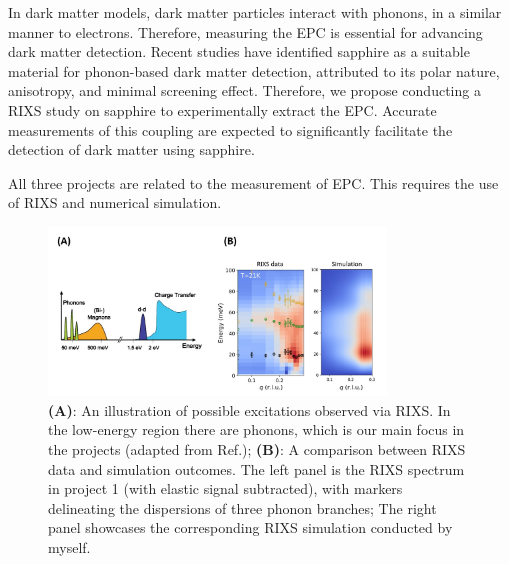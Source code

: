 \documentclass[11pt]{article}
\begin{document}
In dark matter models, dark matter particles interact with phonons, in a similar manner to electrons\cite{griffin_directional_2018}. Therefore, measuring the EPC is essential for advancing dark matter detection. 
Recent studies have identified sapphire as a suitable material for phonon-based dark matter detection, attributed to its polar nature, anisotropy, and minimal screening effect\cite{griffin_directional_2018}.
Therefore, we propose conducting a RIXS study on sapphire to experimentally extract the EPC. Accurate measurements of this coupling are expected to significantly facilitate the detection of dark matter using sapphire.

All three projects are related to the measurement of EPC. This requires the use of RIXS and numerical simulation.

\begin{figure}[!t]
    \centering
    \includegraphics[width=0.8\textwidth]{figures/new_figure2.jpg}
    \caption{\textbf{(A)}: An illustration of possible excitations observed via RIXS. In the low-energy region there are phonons, which is our main focus in the projects (adapted from Ref.\cite{ament_resonant_2011}); \textbf{(B)}: A comparison between RIXS data and simulation outcomes. The left panel is the RIXS spectrum in project 1 (with elastic signal subtracted), with markers delineating the dispersions of three phonon branches; The right panel showcases the corresponding RIXS simulation conducted by myself.}  
    \label{simulation}
\end{figure}
\end{document}
